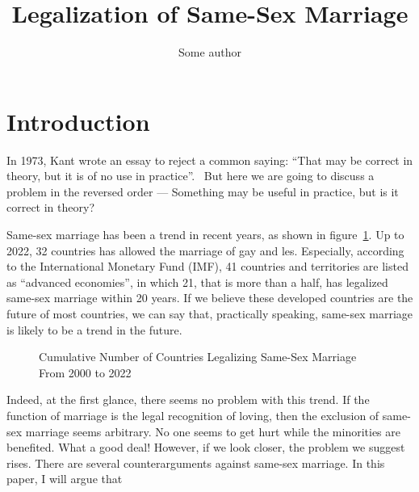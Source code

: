 \documentclass{article}
\title{Legalization of Same-Sex Marriage}
\author{Some author}
\begin{document}
\maketitle
\newpage
\tableofcontents
\newpage
\section{Introduction}
In 1973, Kant wrote an essay to reject a common saying: ``That may be correct in theory, but it is of no use in practice''.~\autocite{kantCommonSayingThat2009} But here we are going to discuss a problem in the reversed order --- Something may be useful in practice, but is it correct in theory? 

Same-sex marriage has been a trend in recent years, as shown in figure~\ref{Cumu}. Up to 2022, 32 countries has allowed the marriage of gay and les. Especially, according to the International Monetary Fund (IMF), 41 countries and territories are listed as ``advanced economies'', in which 21, that is more than a half, has legalized same-sex marriage within 20 years. If we believe these developed countries are the future of most countries, we can say that, practically speaking, same-sex marriage is likely to be a trend in the future.


\begin{figure}[H]
    \centering
        
    \caption{Cumulative Number of Countries Legalizing Same-Sex Marriage From 2000 to 2022~\autocite{perper32CountriesWorld2022}}
    \label{Cumu}
\end{figure}
    

Indeed, at the first glance, there seems no problem with this trend. If the function of marriage is the legal recognition of loving, then the exclusion of same-sex marriage seems arbitrary. No one seems to get hurt while the minorities are benefited. What a good deal! However, if we look closer, the problem we suggest rises. There are several counterarguments against same-sex marriage. In this paper, I will argue that 
\end{document}
